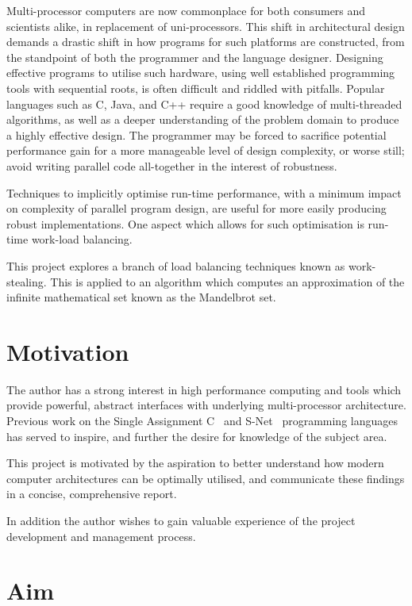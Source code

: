 Multi-processor computers are now commonplace for both consumers and scientists alike, in replacement of uni-processors. 
This shift in architectural design demands a drastic shift in how programs for such platforms are constructed, 
from the standpoint of both the programmer and the language designer. 
Designing effective programs to utilise such hardware, using well established programming tools with sequential roots,
is often difficult and riddled with pitfalls. Popular languages such as C, Java, and C++ require a good knowledge of multi-threaded 
algorithms, as well as a deeper understanding of the problem domain to produce a highly effective design.
The programmer may be forced to sacrifice potential performance gain for a more manageable level of design complexity,
or worse still; avoid writing parallel code all-together in the interest of robustness.

Techniques to implicitly optimise run-time performance, with a minimum impact on complexity of parallel program design, 
are useful for more easily producing robust implementations. One aspect which allows for such optimisation is run-time work-load balancing.

This project explores a branch of load balancing techniques known as work-stealing. This is applied to an algorithm which
computes an approximation of the infinite mathematical set known as the Mandelbrot set.

\section*{Motivation}

The author has a strong interest in high performance computing and tools which provide powerful, abstract interfaces with 
underlying multi-processor architecture. Previous work on the Single Assignment C~\cite{sachome} and 
S-Net~\cite{snethome} programming languages has served to inspire, and further the desire for knowledge of the subject area.

This project is motivated by the aspiration to better understand how modern computer architectures can be optimally utilised,
and communicate these findings in a concise, comprehensive report.

In addition the author wishes to gain valuable experience of the project development and management process.

\section*{Aim}


